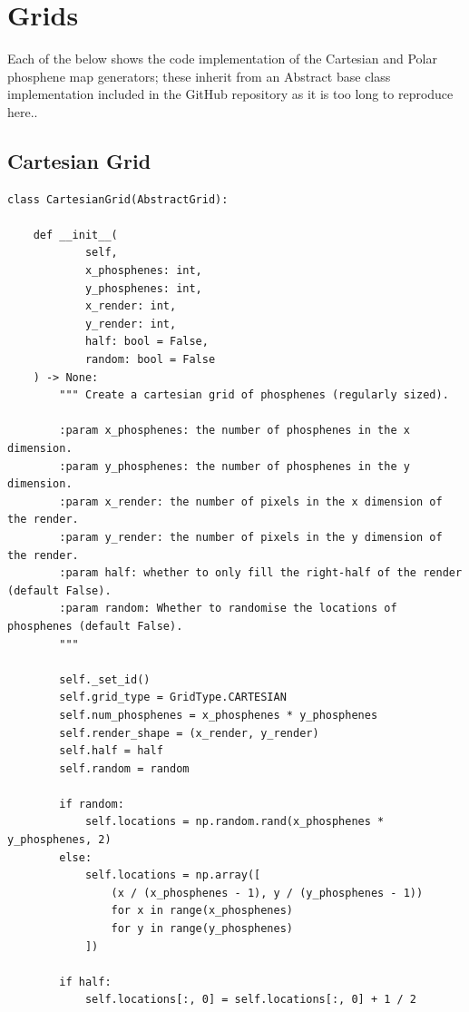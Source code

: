 \documentclass[a4paper,11pt,openany]{book}
\begin{document}
\begin{appendices}
\begin{small}
\begin{verbatim}
\end{verbatim}
\end{small}

\section*{Grids}
\label{sec:org7ddd91f}

Each of the below shows the code implementation of the Cartesian and Polar phosphene map generators; these inherit from an Abstract base class implementation included in the GitHub repository as it is too long to reproduce here..
\subsection*{Cartesian Grid}
\label{sec:org47c63e5}

\begin{footnotesize}
\begin{verbatim}
class CartesianGrid(AbstractGrid):

    def __init__(
            self,
            x_phosphenes: int,
            y_phosphenes: int,
            x_render: int,
            y_render: int,
            half: bool = False,
            random: bool = False
    ) -> None:
        """ Create a cartesian grid of phosphenes (regularly sized).

        :param x_phosphenes: the number of phosphenes in the x dimension.
        :param y_phosphenes: the number of phosphenes in the y dimension.
        :param x_render: the number of pixels in the x dimension of the render.
        :param y_render: the number of pixels in the y dimension of the render.
        :param half: whether to only fill the right-half of the render (default False).
        :param random: Whether to randomise the locations of phosphenes (default False).
        """

        self._set_id()
        self.grid_type = GridType.CARTESIAN
        self.num_phosphenes = x_phosphenes * y_phosphenes
        self.render_shape = (x_render, y_render)
        self.half = half
        self.random = random

        if random:
            self.locations = np.random.rand(x_phosphenes * y_phosphenes, 2)
        else:
            self.locations = np.array([
                (x / (x_phosphenes - 1), y / (y_phosphenes - 1))
                for x in range(x_phosphenes)
                for y in range(y_phosphenes)
            ])

        if half:
            self.locations[:, 0] = self.locations[:, 0] + 1 / 2


\end{verbatim}
\end{footnotesize}
\end{appendices}
\end{document}
